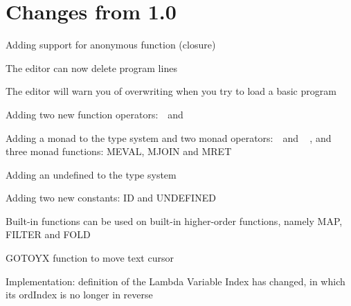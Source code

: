 \chapter{Changes from 1.0}

\begin{itemlist}
\item Adding support for anonymous function (closure)
\item The editor can now delete program lines
\item The editor will warn you of overwriting when you try to load a basic program
\item Adding two new function operators: \basicapply\ \,and\ \,\basiccompo
\item Adding a monad to the type system and two monad operators: \basicmbind\ \,and\ \,\basicmseq\ , and three monad functions: MEVAL, MJOIN and MRET
\item Adding an undefined to the type system
\item Adding two new constants: ID and UNDEFINED
\item Built-in functions can be used on built-in higher-order functions, namely MAP, FILTER and FOLD
\item GOTOYX function to move text cursor
\item Implementation: definition of the Lambda Variable Index has changed, in which its ordIndex is no longer in reverse
\end{itemlist}
